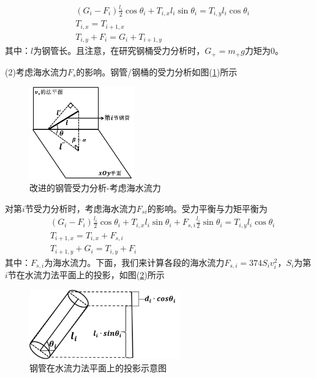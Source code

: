 \documentclass[UTF8]{ctexbook}
\theoremstyle{nonumberplain}
\begin{document}
            \begin{align*}
            & (G_i - F_i)\frac{l_i}{2}\cos\theta_i+T_{i,x}l_i\sin\theta_i = T_{i,y}l_i\cos\theta_i\\
            & T_{i,x} = T_{i+1,x}\\
            & T_{i,y} + F_i = G_i + T_{i+1,y}
            \end{align*}
            其中：$l$为钢管长。且注意，在研究钢桶受力分析时，$G_+ = m_+g$力矩为0。
            \par
            (2)考虑海水流力$F_s$的影响。钢管/钢桶的受力分析如图(\ref{改进的钢管受力分析-考虑海水流力})所示
            \begin{figure}[H]
            \centering
            \includegraphics[height=4cm]{images/Steel_pipe_force_area.jpg}
            \caption{改进的钢管受力分析-考虑海水流力}
            \label{改进的钢管受力分析-考虑海水流力}
            \end{figure}
            对第$i$节受力分析时，考虑海水流力$F_{si}$的影响。受力平衡与力矩平衡为
            \begin{align*}
            & (G_i-F_i)\frac{l_i}{2}\cos\theta_i+T_{i,x}l_i\sin \theta_i+F_{s,i}\frac{l_i}{2}\sin \theta_i = T_{i,y}l_i\cos\theta_i\\
            & T_{i+1,x} = T_{i,x}+F_{s,i}\\
            & T_{i+1,y}+G_i = T_{i,y}+F_i
            \end{align*}
            其中：$F_{s,i}$为海水流力。下面，我们来计算各段的海水流力$F_{s,i} = 374S_i v_i^2$，$S_i$为第$i$节在水流力法平面上的投影，如图(\ref{钢管在水流力法平面上的投影示意图})所示
            \begin{figure}[H]
            \centering
            \includegraphics[height=3cm]{images/Pipe_projection.jpg}
            \caption{钢管在水流力法平面上的投影示意图}
            \label{钢管在水流力法平面上的投影示意图}
            \end{figure}
\end{document}
